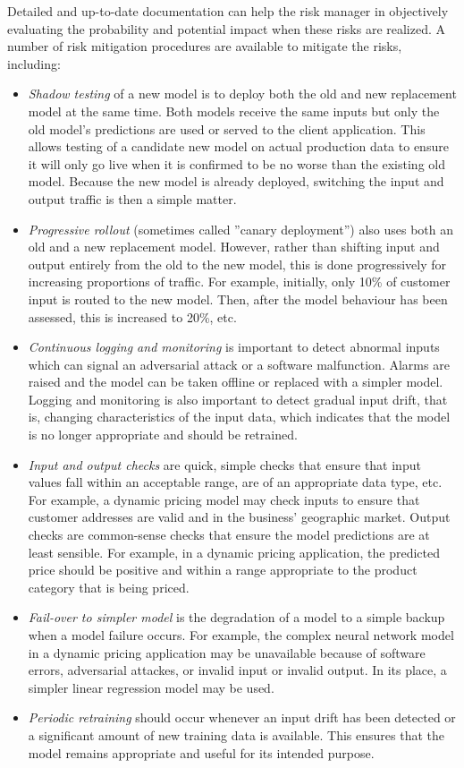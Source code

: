 Detailed and up-to-date documentation can help the risk manager in objectively evaluating the probability and potential impact when these risks are realized. A number of risk mitigation procedures are available to mitigate the risks, including:

\begin{itemize}
   \item \emph{Shadow testing} of a new model is to deploy both the old and new replacement model at the same time. Both models receive the same inputs but only the old model's predictions are used or served to the client application. This allows testing of a candidate new model on actual production data to ensure it will only go live when it is confirmed to be no worse than the existing old model. Because the new model is already deployed, switching the input and output traffic is then a simple matter.
   \item \emph{Progressive rollout} (sometimes called ''canary deployment'') also uses both an old and a new replacement model. However, rather than shifting input and output entirely from the old to the new model, this is done progressively for increasing proportions of traffic. For example, initially, only 10\% of customer input is routed to the new model. Then, after the model behaviour has been assessed, this is increased to 20\%, etc.
   \item \emph{Continuous logging and monitoring} is important to detect abnormal inputs which can signal an adversarial attack or a software malfunction. Alarms are raised and the model can be taken offline or replaced with a simpler model. Logging and monitoring is also important to detect gradual input drift, that is, changing characteristics of the input data, which indicates that the model is no longer appropriate and should be retrained. 
   \item \emph{Input and output checks} are quick, simple checks that ensure that input values fall within an acceptable range, are of an appropriate data type, etc. For example, a dynamic pricing model may check inputs to ensure that customer addresses are valid and in the business' geographic market. Output checks are common-sense checks that ensure the model predictions are at least sensible. For example, in a dynamic pricing application, the predicted price should be positive and within a range appropriate to the product category that is being priced. 
   \item \emph{Fail-over to simpler model} is the degradation of a model to a simple backup when a model failure occurs. For example, the complex neural network model in a dynamic pricing application may be unavailable because of software errors, adversarial attackes, or invalid input or invalid output. In its place, a simpler linear regression model may be used.
   \item \emph{Periodic retraining} should occur whenever an input drift has been detected or a significant amount of new training data is available. This ensures that the model remains appropriate and useful for its intended purpose.
\end{itemize}

